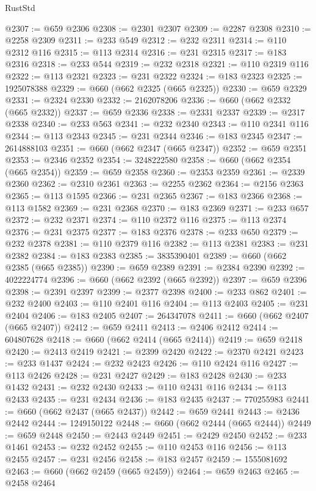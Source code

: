 \begin{lexlean}{RustStd}
\begin{coremodule}
@2307 := @659 @2306
@2308 := @2301 @2307
@2309 := @2287 @2308
@2310 := @2258 @2309
@2311 := @233 @549
@2312 := @232 @2311
@2314 := @110 @2312 @116
@2315 := @113 @2314
@2316 := @231 @2315
@2317 := @183 @2316
@2318 := @233 @544
@2319 := @232 @2318
@2321 := @110 @2319 @116
@2322 := @113 @2321
@2323 := @231 @2322
@2324 := @183 @2323
@2325 := 1925078388
@2329 := @660 (@662 @2325 (@665 @2325))
@2330 := @659 @2329
@2331 := @2324 @2330
@2332 := 2162078206
@2336 := @660 (@662 @2332 (@665 @2332))
@2337 := @659 @2336
@2338 := @2331 @2337
@2339 := @2317 @2338
@2340 := @233 @563
@2341 := @232 @2340
@2343 := @110 @2341 @116
@2344 := @113 @2343
@2345 := @231 @2344
@2346 := @183 @2345
@2347 := 2614888103
@2351 := @660 (@662 @2347 (@665 @2347))
@2352 := @659 @2351
@2353 := @2346 @2352
@2354 := 3248222580
@2358 := @660 (@662 @2354 (@665 @2354))
@2359 := @659 @2358
@2360 := @2353 @2359
@2361 := @2339 @2360
@2362 := @2310 @2361
@2363 := @2255 @2362
@2364 := @2156 @2363
@2365 := @113 @1595
@2366 := @231 @2365
@2367 := @183 @2366
@2368 := @113 @1582
@2369 := @231 @2368
@2370 := @183 @2369
@2371 := @233 @657
@2372 := @232 @2371
@2374 := @110 @2372 @116
@2375 := @113 @2374
@2376 := @231 @2375
@2377 := @183 @2376
@2378 := @233 @650
@2379 := @232 @2378
@2381 := @110 @2379 @116
@2382 := @113 @2381
@2383 := @231 @2382
@2384 := @183 @2383
@2385 := 3835390401
@2389 := @660 (@662 @2385 (@665 @2385))
@2390 := @659 @2389
@2391 := @2384 @2390
@2392 := 4022224774
@2396 := @660 (@662 @2392 (@665 @2392))
@2397 := @659 @2396
@2398 := @2391 @2397
@2399 := @2377 @2398
@2400 := @233 @862
@2401 := @232 @2400
@2403 := @110 @2401 @116
@2404 := @113 @2403
@2405 := @231 @2404
@2406 := @183 @2405
@2407 := 264347078
@2411 := @660 (@662 @2407 (@665 @2407))
@2412 := @659 @2411
@2413 := @2406 @2412
@2414 := 604807628
@2418 := @660 (@662 @2414 (@665 @2414))
@2419 := @659 @2418
@2420 := @2413 @2419
@2421 := @2399 @2420
@2422 := @2370 @2421
@2423 := @233 @1437
@2424 := @232 @2423
@2426 := @110 @2424 @116
@2427 := @113 @2426
@2428 := @231 @2427
@2429 := @183 @2428
@2430 := @233 @1432
@2431 := @232 @2430
@2433 := @110 @2431 @116
@2434 := @113 @2433
@2435 := @231 @2434
@2436 := @183 @2435
@2437 := 770255983
@2441 := @660 (@662 @2437 (@665 @2437))
@2442 := @659 @2441
@2443 := @2436 @2442
@2444 := 1249150122
@2448 := @660 (@662 @2444 (@665 @2444))
@2449 := @659 @2448
@2450 := @2443 @2449
@2451 := @2429 @2450
@2452 := @233 @1461
@2453 := @232 @2452
@2455 := @110 @2453 @116
@2456 := @113 @2455
@2457 := @231 @2456
@2458 := @183 @2457
@2459 := 1555081692
@2463 := @660 (@662 @2459 (@665 @2459))
@2464 := @659 @2463
@2465 := @2458 @2464

\end{coremodule}
\end{lexlean}
